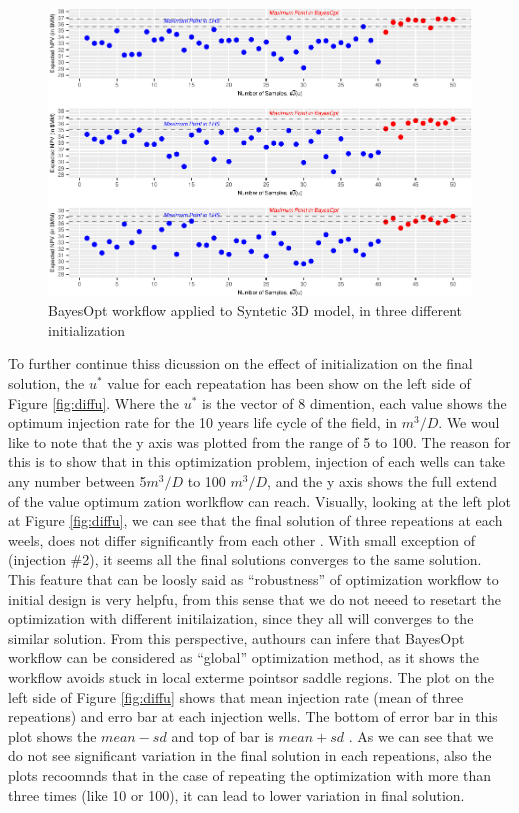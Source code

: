 \documentclass[]{elsarticle} %
\begin{document}
\begin{figure}

{\centering \includegraphics[width=0.9\linewidth,height=0.9\textheight]{0_Paper1_main_files/figure-latex/difinit-1} 

}

\caption{BayesOpt workflow applied to Syntetic 3D model, in three different initialization}\label{fig:difinit}
\end{figure}

To further continue thiss dicussion on the effect of initialization on the final solution, the \(u^*\) value for each repeatation has been show on the left side of Figure \ref{fig:diffu}. Where the \(u^*\) is the vector of 8 dimention, each value shows the optimum injection rate for the 10 years life cycle of the field, in \(m^3/D\). We woul like to note that the y axis was plotted from the range of 5 to 100. The reason for this is to show that in this optimization problem, injection of each wells can take any number between 5\(m^3/D\) to 100 \(m^3/D\), and the y axis shows the full extend of the value optimum zation worlkflow can reach. Visually, looking at the left plot at Figure \ref{fig:diffu}, we can see that the final solution of three repeations at each weels, does not differ significantly from each other . With small exception of (injection \#2), it seems all the final solutions converges to the same solution. This feature that can be loosly said as ``robustness'' of optimization workflow to initial design is very helpfu, from this sense that we do not neeed to resetart the optimization with different initilaization, since they all will converges to the similar solution. From this perspective, authours can infere that BayesOpt workflow can be considered as ``global'' optimization method, as it shows the workflow avoids stuck in local exterme pointsor saddle regions. The plot on the left side of Figure \ref{fig:diffu} shows that mean injection rate (mean of three repeations) and erro bar at each injection wells. The bottom of error bar in this plot shows the \(mean-sd\) and top of bar is \(mean + sd\) . As we can see that we do not see significant variation in the final solution in each repeations, also the plots recoomnds that in the case of repeating the optimization with more than three times (like 10 or 100), it can lead to lower variation in final solution.
\end{document}
